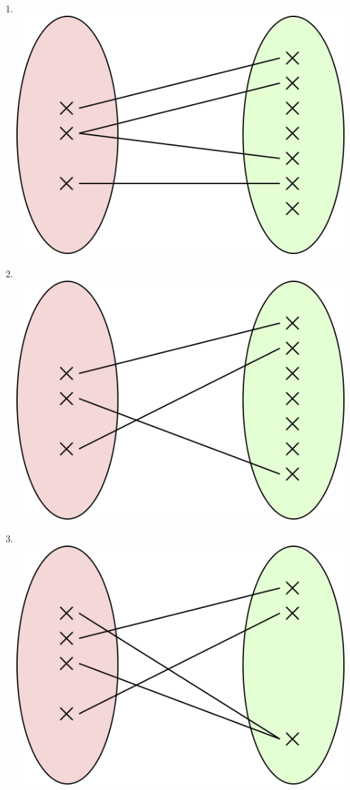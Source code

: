 \documentclass[a4paper,12pt,french]{book}
\begin{document}
\begin{exercice}[]
\begin{multicols}{2}
\begin{enumerate}
	\item 	\ \\\includegraphics[width=\myw]{img/3.png}
	\item 	\ \\\includegraphics[width=\myw]{img/4.png}
	\item 	\ \\\includegraphics[width=\myw]{img/5.png}

\end{enumerate}
\end{multicols}
\end{exercice}
\end{document}
